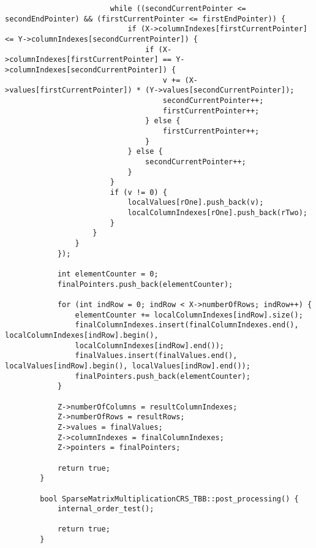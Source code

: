 \documentclass[a4paper, 14pt]{article}
\begin{document}
\begin{verbatim}
						while ((secondCurrentPointer <= secondEndPointer) && (firstCurrentPointer <= firstEndPointer)) {
							if (X->columnIndexes[firstCurrentPointer] <= Y->columnIndexes[secondCurrentPointer]) {
								if (X->columnIndexes[firstCurrentPointer] == Y->columnIndexes[secondCurrentPointer]) {
									v += (X->values[firstCurrentPointer]) * (Y->values[secondCurrentPointer]);
									secondCurrentPointer++;
									firstCurrentPointer++;
								} else {
									firstCurrentPointer++;
								}
							} else {
								secondCurrentPointer++;
							}
						}
						if (v != 0) {
							localValues[rOne].push_back(v);
							localColumnIndexes[rOne].push_back(rTwo);
						}
					}
				}
			});
			
			int elementCounter = 0;
			finalPointers.push_back(elementCounter);
			
			for (int indRow = 0; indRow < X->numberOfRows; indRow++) {
				elementCounter += localColumnIndexes[indRow].size();
				finalColumnIndexes.insert(finalColumnIndexes.end(), localColumnIndexes[indRow].begin(),
				localColumnIndexes[indRow].end());
				finalValues.insert(finalValues.end(), localValues[indRow].begin(), localValues[indRow].end());
				finalPointers.push_back(elementCounter);
			}
			
			Z->numberOfColumns = resultColumnIndexes;
			Z->numberOfRows = resultRows;
			Z->values = finalValues;
			Z->columnIndexes = finalColumnIndexes;
			Z->pointers = finalPointers;
			
			return true;
		}
		
		bool SparseMatrixMultiplicationCRS_TBB::post_processing() {
			internal_order_test();
			
			return true;
		}
	\end{verbatim}
	
\end{document}
